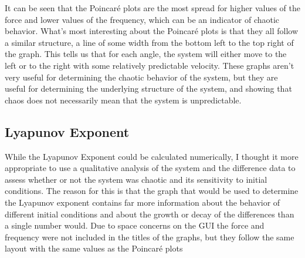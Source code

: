 \documentclass[11pt]{article} %
\begin{document}
    It can be seen that the Poincar\'e plots are the most spread for higher values of the force and lower values of the frequency, which can be
    an indicator of chaotic behavior. What's most interesting about the Poincar\'e plots is that they all follow a similar structure, a line of
    some width from the bottom left to the top right of the graph. This tells us that for each angle, the system will either move to the left or
    to the right with some relatively predictable velocity. These graphs aren't very useful for determining the chaotic behavior of the system,
    but they are useful for determining the underlying structure of the system, and showing that chaos does not necessarily mean that the system
    is unpredictable.\\
    \subsection{Lyapunov Exponent}
    While the Lyapunov Exponent could be calculated numerically, I thought it more appropriate to use a qualitative analysis of the system and
    the difference data to assess whether or not the system was chaotic and its sensitivity to initial conditions. The reason for this is that
    the graph that would be used to determine the Lyapunov exponent contains far more information about the behavior of different initial conditions
    and about the growth or decay of the differences than a single number would. Due to space concerns on the GUI the force and frequency were not
    included in the titles of the graphs, but they follow the same layout with the same values as the Poincar\'e plots
\end{document}
